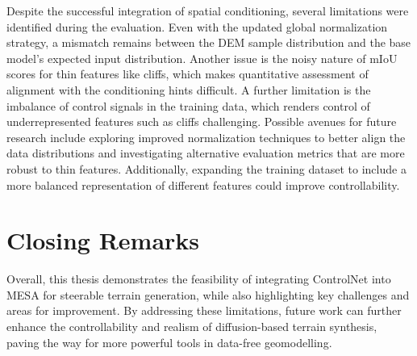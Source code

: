 Despite the successful integration of spatial conditioning, several limitations were identified during the evaluation. Even with the updated global normalization strategy, a mismatch remains between the DEM sample distribution and the base model's expected input distribution. Another issue is the noisy nature of mIoU scores for thin features like cliffs, which makes quantitative assessment of alignment with the conditioning hints difficult. A further limitation is the imbalance of control signals in the training data, which renders control of underrepresented features such as cliffs challenging. Possible avenues for future research include exploring improved normalization techniques to better align the data distributions and investigating alternative evaluation metrics that are more robust to thin features. Additionally, expanding the training dataset to include a more balanced representation of different features could improve controllability.

\section{Closing Remarks}
\label{sec:closing_remarks}

Overall, this thesis demonstrates the feasibility of integrating ControlNet into MESA for steerable terrain generation, while also highlighting key challenges and areas for improvement. By addressing these limitations, future work can further enhance the controllability and realism of diffusion-based terrain synthesis, paving the way for more powerful tools in data-free geomodelling.
